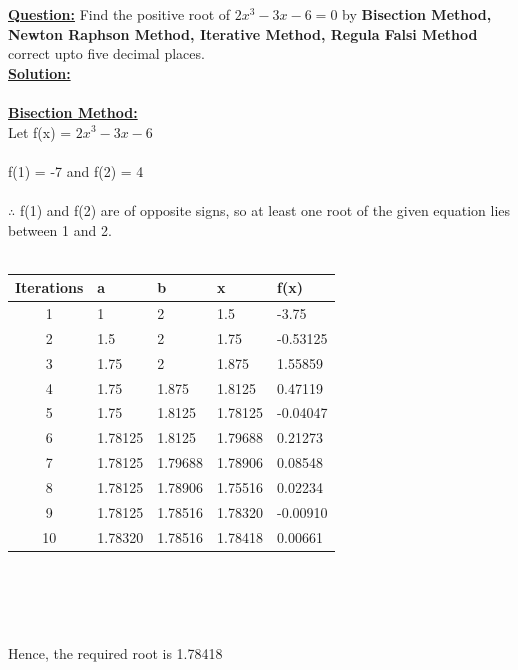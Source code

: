 \documentclass[12pt,a4paper]{article}
\begin{document}
	\textbf{\underline{Question:}} Find the positive root of $2x^3 - 3x -6 = 0$ by  \textbf{Bisection Method, Newton Raphson Method, Iterative Method, Regula Falsi Method} correct upto five decimal places. \\
	
	\textbf{\underline{Solution:}}\\\\
	\underline{\textbf{Bisection Method:}}\\
	Let f(x) = $2x^3 - 3x -6 $\\\\
	f(1) = -7 and f(2) = 4 \\\\
	$\therefore$ f(1) and f(2) are of opposite signs, so at least one root of the given equation lies between 1 and 2.
	\\\\
	
	\begin{tabularx}{\textwidth}{|c|X|X|X|X|}
		\hline
		Iterations & a & b & x & f(x) \\
		\hline
		1 & 1 & 2 & 1.5 & -3.75 \\
		\hline
		2 & 1.5 & 2 & 1.75 & -0.53125 \\
		\hline
		3 & 1.75 & 2 & 1.875 & 1.55859 \\
		\hline
		4 & 1.75 & 1.875 & 1.8125 & 0.47119 \\
		\hline
		5 & 1.75 & 1.8125 & 1.78125 & -0.04047 \\
		\hline
		6 & 1.78125 & 1.8125 & 1.79688 & 0.21273 \\
		\hline
		7 & 1.78125 & 1.79688 & 1.78906 & 0.08548 \\
		\hline
		8 & 1.78125 & 1.78906 & 1.75516 & 0.02234 \\
		\hline
		9 & 1.78125 & 1.78516 & 1.78320 & -0.00910 \\
		\hline
		10 & 1.78320 & 1.78516 & 1.78418 & 0.00661 \\
		\hline
	\end{tabularx}\\\\
	\\\\Hence, the required root is 1.78418
	
\end{document}
